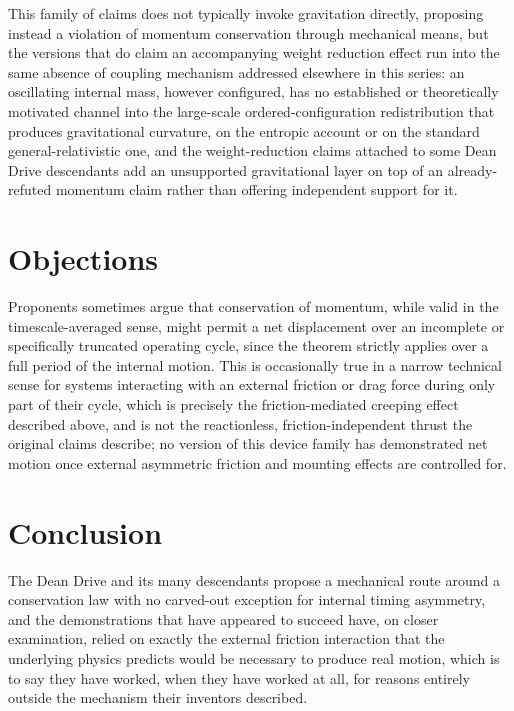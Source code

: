 \documentclass[11pt]{article}
\begin{document}
This family of claims does not typically invoke gravitation directly, proposing instead a violation of momentum conservation through mechanical means, but the versions that do claim an accompanying weight reduction effect run into the same absence of coupling mechanism addressed elsewhere in this series: an oscillating internal mass, however configured, has no established or theoretically motivated channel into the large-scale ordered-configuration redistribution that produces gravitational curvature, on the entropic account or on the standard general-relativistic one, and the weight-reduction claims attached to some Dean Drive descendants add an unsupported gravitational layer on top of an already-refuted momentum claim rather than offering independent support for it.

\section{Objections}

Proponents sometimes argue that conservation of momentum, while valid in the timescale-averaged sense, might permit a net displacement over an incomplete or specifically truncated operating cycle, since the theorem strictly applies over a full period of the internal motion. This is occasionally true in a narrow technical sense for systems interacting with an external friction or drag force during only part of their cycle, which is precisely the friction-mediated creeping effect described above, and is not the reactionless, friction-independent thrust the original claims describe; no version of this device family has demonstrated net motion once external asymmetric friction and mounting effects are controlled for.

\section{Conclusion}

The Dean Drive and its many descendants propose a mechanical route around a conservation law with no carved-out exception for internal timing asymmetry, and the demonstrations that have appeared to succeed have, on closer examination, relied on exactly the external friction interaction that the underlying physics predicts would be necessary to produce real motion, which is to say they have worked, when they have worked at all, for reasons entirely outside the mechanism their inventors described.
\end{document}
